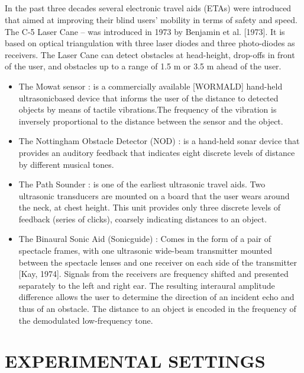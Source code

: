 \documentclass[10pt,a4paper,twoside]{report}
\newcommand\blankpage{
	\null
	\thispagestyle{empty}
	\addtocounter{page}{-1}
	\newpage}
\begin{document}
\paragraph{ }In the past three decades several electronic travel aids (ETAs) were introduced that
aimed at improving their blind users’ mobility in terms of safety and speed. The C-5
Laser Cane – was introduced in 1973 by Benjamin et al. [1973]. It is based on optical
triangulation with three laser diodes and three photo-diodes as receivers. The Laser
Cane can detect obstacles at head-height, drop-offs in front of the user, and obstacles
up to a range of 1.5 m or 3.5 m ahead of the user.
\begin{itemize}
\item The Mowat sensor : is a commercially available [WORMALD] hand-held ultrasonicbased device that informs the user of the distance to detected objects by means of
tactile vibrations.The frequency of the vibration is inversely proportional to the distance
between the sensor and the object.
\item The Nottingham Obstacle Detector (NOD) : is a hand-held sonar device that provides
an auditory feedback that indicates eight discrete levels of distance by different
musical tones.
\item The Path Sounder : is one of the earliest ultrasonic travel aids. Two ultrasonic transducers are mounted on a board that the user wears around the neck, at chest height. This
unit provides only three discrete levels of feedback (series of clicks), coarsely indicating
distances to an object.
\item The Binaural Sonic Aid (Sonicguide) : Comes in the form of a pair of spectacle frames,
with one ultrasonic wide-beam transmitter mounted between the spectacle lenses and
one receiver on each side of the transmitter [Kay, 1974]. Signals from the receivers are
frequency shifted and presented separately to the left and right ear. The resulting interaural
amplitude difference allows the user to determine the direction of an incident echo
and thus of an obstacle. The distance to an object is encoded in the frequency of the
demodulated low-frequency tone. 

\end{itemize}

\newpage
\blankpage
\chapter{EXPERIMENTAL SETTINGS}
\end{document}
